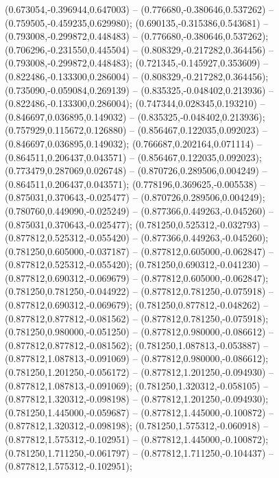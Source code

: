  (0.673054,-0.396944,0.647003) -- (0.776680,-0.380646,0.537262) -- (0.759505,-0.459235,0.629980);
 (0.690135,-0.315386,0.543681) -- (0.793008,-0.299872,0.448483) -- (0.776680,-0.380646,0.537262);
 (0.706296,-0.231550,0.445504) -- (0.808329,-0.217282,0.364456) -- (0.793008,-0.299872,0.448483);
 (0.721345,-0.145927,0.353609) -- (0.822486,-0.133300,0.286004) -- (0.808329,-0.217282,0.364456);
 (0.735090,-0.059084,0.269139) -- (0.835325,-0.048402,0.213936) -- (0.822486,-0.133300,0.286004);
 (0.747344,0.028345,0.193210) -- (0.846697,0.036895,0.149032) -- (0.835325,-0.048402,0.213936);
 (0.757929,0.115672,0.126880) -- (0.856467,0.122035,0.092023) -- (0.846697,0.036895,0.149032);
 (0.766687,0.202164,0.071114) -- (0.864511,0.206437,0.043571) -- (0.856467,0.122035,0.092023);
 (0.773479,0.287069,0.026748) -- (0.870726,0.289506,0.004249) -- (0.864511,0.206437,0.043571);
 (0.778196,0.369625,-0.005538) -- (0.875031,0.370643,-0.025477) -- (0.870726,0.289506,0.004249);
 (0.780760,0.449090,-0.025249) -- (0.877366,0.449263,-0.045260) -- (0.875031,0.370643,-0.025477);
 (0.781250,0.525312,-0.032793) -- (0.877812,0.525312,-0.055420) -- (0.877366,0.449263,-0.045260);
 (0.781250,0.605000,-0.037187) -- (0.877812,0.605000,-0.062847) -- (0.877812,0.525312,-0.055420);
 (0.781250,0.690312,-0.041230) -- (0.877812,0.690312,-0.069679) -- (0.877812,0.605000,-0.062847);
 (0.781250,0.781250,-0.044922) -- (0.877812,0.781250,-0.075918) -- (0.877812,0.690312,-0.069679);
 (0.781250,0.877812,-0.048262) -- (0.877812,0.877812,-0.081562) -- (0.877812,0.781250,-0.075918);
 (0.781250,0.980000,-0.051250) -- (0.877812,0.980000,-0.086612) -- (0.877812,0.877812,-0.081562);
 (0.781250,1.087813,-0.053887) -- (0.877812,1.087813,-0.091069) -- (0.877812,0.980000,-0.086612);
 (0.781250,1.201250,-0.056172) -- (0.877812,1.201250,-0.094930) -- (0.877812,1.087813,-0.091069);
 (0.781250,1.320312,-0.058105) -- (0.877812,1.320312,-0.098198) -- (0.877812,1.201250,-0.094930);
 (0.781250,1.445000,-0.059687) -- (0.877812,1.445000,-0.100872) -- (0.877812,1.320312,-0.098198);
 (0.781250,1.575312,-0.060918) -- (0.877812,1.575312,-0.102951) -- (0.877812,1.445000,-0.100872);
 (0.781250,1.711250,-0.061797) -- (0.877812,1.711250,-0.104437) -- (0.877812,1.575312,-0.102951);
